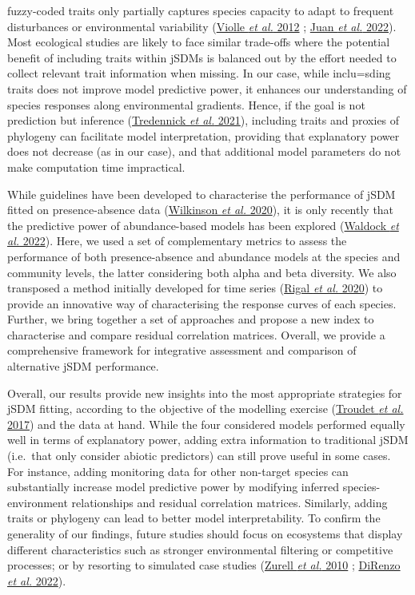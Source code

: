 \documentclass[9pt,biorxiv,doublespacing,lineno]{lapreprint}
\begin{document}
fuzzy-coded traits only partially captures species capacity to adapt to
frequent disturbances or environmental variability
(\protect\hyperlink{ref-Violle_2012}{Violle \emph{et al.} 2012} ;
\protect\hyperlink{ref-deJuan_2022}{Juan \emph{et al.} 2022}). Most
ecological studies are likely to face similar trade-offs where the
potential benefit of including traits within jSDMs is balanced out by
the effort needed to collect relevant trait information when missing. In
our case, while inclu=sding traits does not improve model predictive
power, it enhances our understanding of species responses along
environmental gradients. Hence, if the goal is not prediction but
inference (\protect\hyperlink{ref-Tredennick_2021}{Tredennick \emph{et
al.} 2021}), including traits and proxies of phylogeny can facilitate
model interpretation, providing that explanatory power does not decrease
(as in our case), and that additional model parameters do not make
computation time impractical.

While guidelines have been developed to characterise the performance of
jSDM fitted on presence-absence data
(\protect\hyperlink{ref-Wilkinson_2020}{Wilkinson \emph{et al.} 2020}),
it is only recently that the predictive power of abundance-based models
has been explored (\protect\hyperlink{ref-Waldock_2022}{Waldock \emph{et
al.} 2022}). Here, we used a set of complementary metrics to assess the
performance of both presence-absence and abundance models at the species
and community levels, the latter considering both alpha and beta
diversity. We also transposed a method initially developed for time
series (\protect\hyperlink{ref-Rigal_2020}{Rigal \emph{et al.} 2020}) to
provide an innovative way of characterising the response curves of each
species. Further, we bring together a set of approaches and propose a
new index to characterise and compare residual correlation matrices.
Overall, we provide a comprehensive framework for integrative assessment
and comparison of alternative jSDM performance.

Overall, our results provide new insights into the most appropriate
strategies for jSDM fitting, according to the objective of the modelling
exercise (\protect\hyperlink{ref-Troudet_2017}{Troudet \emph{et al.}
2017}) and the data at hand. While the four considered models performed
equally well in terms of explanatory power, adding extra information to
traditional jSDM (i.e.~that only consider abiotic predictors) can still
prove useful in some cases. For instance, adding monitoring data for
other non-target species can substantially increase model predictive
power by modifying inferred species-environment relationships and
residual correlation matrices. Similarly, adding traits or phylogeny can
lead to better model interpretability. To confirm the generality of our
findings, future studies should focus on ecosystems that display
different characteristics such as stronger environmental filtering or
competitive processes; or by resorting to simulated case studies
(\protect\hyperlink{ref-Zurell_2010}{Zurell \emph{et al.} 2010} ;
\protect\hyperlink{ref-DiRenzo_2022}{DiRenzo \emph{et al.} 2022}).
\end{document}
